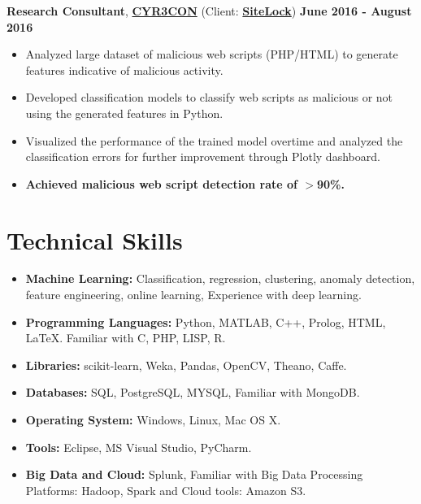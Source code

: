 \documentclass[margin,line]{CV}
\begin{document}
\begin{resume}
{\bf Research Consultant}, \href{http://www.cyr3con.com/}{\bf CYR3CON} (Client: \href{https://www.sitelock.com/}{\bf SiteLock})  \hfill {\bf June 2016 - August 2016}
\begin{itemize}
	\item Analyzed large dataset of malicious web scripts (PHP/HTML) to generate features indicative of malicious activity.
	\item Developed classification models to classify web scripts as malicious or not using the generated features in Python.
	\item Visualized the performance of the trained model overtime and analyzed the classification errors for further improvement through Plotly dashboard.
	\item {\bf Achieved malicious web script detection rate of $>$90\%.}
	
\end{itemize}

\section{\sc Technical Skills} 
\begin{itemize}[leftmargin =*]

\item {\bf Machine Learning:} Classification, regression, clustering, anomaly detection, feature engineering, online learning, Experience with deep learning.

\item{\bf Programming Languages:} Python, MATLAB, C++, Prolog, HTML, LaTeX. Familiar with C, PHP, LISP, R. 

\item{\bf Libraries:} scikit-learn, Weka, Pandas, OpenCV, Theano, Caffe. 

\item {\bf Databases:} SQL, PostgreSQL, MYSQL, Familiar with MongoDB.

\item {\bf Operating System:} Windows, Linux, Mac OS X. 

\item {\bf Tools:} Eclipse, MS Visual Studio, PyCharm. 

\item {\bf Big Data and Cloud:} Splunk, Familiar with Big Data Processing Platforms: Hadoop, Spark and Cloud tools: Amazon S3. 

\end{itemize}



\end{resume}
\end{document}

